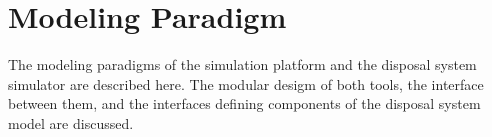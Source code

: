 \chapter{Modeling Paradigm}\label{ch:paradigm}

The modeling paradigms of the \Cyclus simulation platform and the \Cyder 
disposal system simulator are described here. The modular desigm of both tools, 
the interface between them, and the interfaces defining 
components of the \Cyder disposal system model are discussed. 




